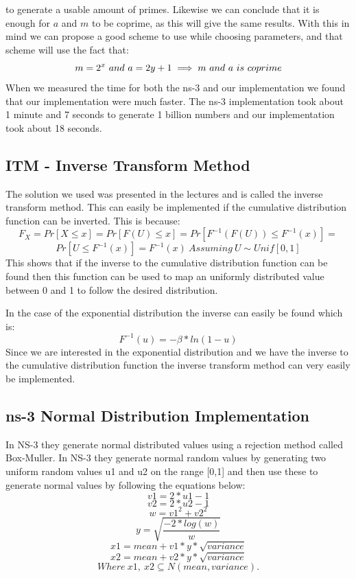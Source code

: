 \documentclass{article}
\begin{document}
    to generate a usable amount of primes.
    Likewise we can conclude that it is enough for $a$ and $m$ to be coprime, as this will give the same results.
    With this in mind we can propose a good scheme to use while choosing parameters, and that scheme will use the fact that:
    \begin{equation}
      m = 2^{x}\ and\ a = 2y+1 \implies m\ and\ a\ is\ coprime \\
    \end{equation}
    When we measured the time for both the ns-3 and our implementation we found that our implementation were much faster.
    The ns-3 implementation took about 1 minute and 7 seconds to generate 1 billion numbers and our implementation took about 18 seconds.
  \subsection{ITM - Inverse Transform Method}
  The solution we used was presented in the lectures and is called the inverse transform method.
  This can easily be implemented if the cumulative distribution function can be inverted.
  This is because:
  $$ F_{X}=Pr[X \leqslant x]=Pr[F(U) \leqslant x]=Pr[F^{-1}(F(U)) \leqslant F^{-1}(x)]= $$
  $$ Pr[U \leqslant F^{-1}(x)]=F^{-1}(x)\ Assuming\ U \sim Unif[0,1] $$
  This shows that if the inverse to the cumulative distribution function can be found then this function can be used to map an uniformly distributed value between 0 and 1 to follow the desired distribution.
  
  In the case of the exponential distribution the inverse can easily be found which is:
  $$ F^{-1}(u)=-\beta * ln(1-u) $$
  Since we are interested in the exponential distribution and we have the inverse to the cumulative distribution function the inverse transform method can very easily be implemented.
  
  \subsection{ns-3 Normal Distribution Implementation}
  In NS-3 they generate normal distributed values using a rejection method called Box-Muller. In NS-3 they generate normal random values by generating two uniform random values u1 and u2 on the range [0,1] and then use these to generate normal values by following the equations below:
  $$v1 = 2 * u1 - 1$$
  $$v2 = 2 * u2 - 1$$
  $$w = v1^2 + v2^2$$
  $$y = \sqrt{\frac{-2*log(w)}{w}}$$
  $$x1 = mean + v1 * y * \sqrt{variance}$$
  $$x2 = mean + v2 * y * \sqrt{variance}$$
  $$Where\ x1,\ x2 \subseteq N(mean,variance).$$
  
\end{document}
